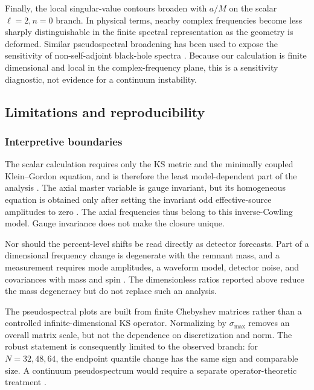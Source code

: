 \documentclass[12pt,a4paper]{article}
\begin{document}
Finally, the local singular-value contours broaden with \(a/M\) on the scalar
\(\ell=2,n=0\) branch.  In physical terms, nearby complex frequencies become
less sharply distinguishable in the finite spectral representation as the
geometry is deformed.  Similar pseudospectral broadening has been used to
expose the sensitivity of non-self-adjoint black-hole spectra
\cite{Jaramillo2021,Cao2024}.  Because our calculation is finite dimensional
and local in the complex-frequency plane, this is a sensitivity diagnostic,
not evidence for a continuum instability.
\color{black}

\subsection{Limitations and reproducibility}

\subsubsection{Interpretive boundaries}

\color{blue}
The scalar calculation requires only the KS metric and the minimally coupled
Klein--Gordon equation, and is therefore the least model-dependent part of the
analysis \cite{Kazakov1994,Konoplya2020}. The axial master variable is gauge
invariant, but its homogeneous equation is obtained only after setting the
invariant odd effective-source amplitudes to zero
\cite{Gerlach1979,Gundlach1999,Karlovini2002}. The axial frequencies thus belong
to this inverse-Cowling model. Gauge invariance does not make the closure unique.
\color{black}

\color{blue}
Nor should the percent-level shifts be read directly as detector forecasts.
Part of a dimensional frequency change is degenerate with the remnant mass,
and a measurement requires mode amplitudes, a waveform model, detector noise,
and covariances with mass and spin \cite{Berti2006,Berti2009,Isi2019}. The
dimensionless ratios reported above reduce the mass degeneracy but do not
replace such an analysis.
\color{black}

\color{blue}
The pseudospectral plots are built from finite Chebyshev matrices rather than a
controlled infinite-dimensional KS operator. Normalizing by
\(\sigma_{\max}\) removes an overall matrix scale, but not the dependence on
discretization and norm. The robust statement is consequently limited to the
observed branch: for \(N=32,48,64\), the endpoint quantile change has the same
sign and comparable size. A continuum
pseudospectrum would require a separate operator-theoretic treatment
\cite{Jaramillo2021,Cao2024}.
\color{black}
\end{document}
